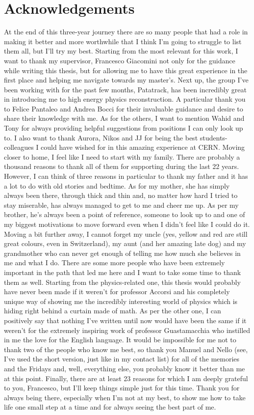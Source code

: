 \chapter*{Acknowledgements}
At the end of this three-year journey there are so many people that had a role in making it better and more worthwhile that I think I'm going to struggle to list them all, but I'll try my best. 
Starting from the most relevant for this work, I want to thank my supervisor, Francesco Giacomini not only for the guidance while writing this thesis, but for allowing me to have this great experience in the first place and helping me navigate towards my master's. Next up, the group I've been working with for the past few months, Patatrack, has been incredibly great in introducing me to high energy physics reconstruction. A particular thank you to Felice Pantaleo and Andrea Bocci for their invaluable guidance and desire to share their knowledge with me. As for the others, I want to mention Wahid and Tony for always providing helpful suggestions from positions I can only look up to.  I also want to thank Aurora, Nikos and JJ for being the best students-colleagues I could have wished for in this amazing experience at CERN. 
Moving closer to home, I feel like I need to start with my family. There are probably a thousand reasons to thank all of them for supporting during the last 22 years. However, I can think of three reasons in particular to thank my father and it has a lot to do with old stories and bedtime. As for my mother, she has simply always been there, through thick and thin and, no matter how hard I tried to stay miserable, has always managed to get to me and cheer me up. As per my brother, he's always been a point of reference, someone to look up to and one of my biggest motivations to move forward even when I didn't feel like I could do it. Moving a bit further away, I cannot forget my uncle (yes, yellow and red are still great colours, even in Switzerland), my aunt (and her amazing late dog) and my grandmother who can never get enough of telling me how much she believes in me and what I do. 
There are some more people who have been extremely important in the path that led me here and I want to take some time to thank them as well. Starting from the physics-related one, this thesis would probably have never been made if it weren't for professor Accorsi and his completely unique way of showing me the incredibly interesting world of physics which is hiding right behind a curtain made of math. As per the other one,  I can positively say that nothing I've written until now would have been the same if it weren't for the extremely inspiring work of professor Guastamacchia who instilled in me the love for the English language. 
It would be impossible for me not to thank two of the people who know me best, so thank you Manuel and Nello (see, I've used the short version, just like in my contact list) for all of the memories and the Fridays and, well, everything else, you probably know it better than me at this point.
Finally, there are at least 23 reasons for which I am deeply grateful to you, Francesco, but I'll keep things simple just for this time. Thank you for always being there, especially when I'm not at my best, to show me how to take life one small step at a time and for always seeing the best part of me. 